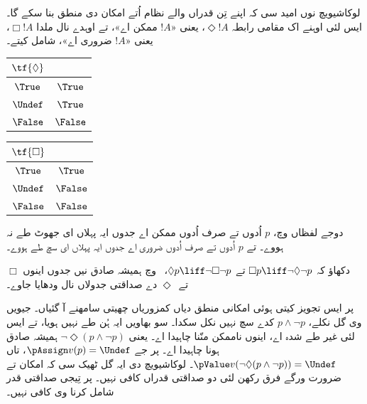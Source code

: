 \documentclass[../../../include/open-logic-section]{subfiles}
\begin{document}
لوکاشیویچ نوں امید سی کہ اپنے تِن قدراں والے نظام اُتے امکان
دی منطق بنا سکے گا۔ ایس لئی اوہنے اک مقامی رابطہ $\Diamond
!A$، یعنی «$!A$ ممکن اے»، تے اوہدے نال ملدا $\Box !A$،
یعنی «$!A$ ضروری اے»، شامل کیتے۔
\begin{center}
  \begin{tabular}{c|c} 
    $\tf{\Diamond}$ & \\ 
    \hline  
    $\True$ & $\True$ \\ 
    $\Undef$ & $\True$ \\
    $\False$ & $\False$ 
  \end{tabular}
  \quad
  \begin{tabular}{c|c} 
    $\tf{\Box}$ & \\ 
    \hline  
    $\True$ & $\True$ \\ 
    $\Undef$ & $\False$ \\
    $\False$ & $\False$ 
  \end{tabular}
\end{center}
دوجے لفظاں وچ، $p$ اُدوں تے صرف اُدوں ممکن اے جدوں ایہ
پہلاں ای جھوٹ طے نہ ہووے۔ تے $p$ اُدوں تے صرف اُدوں ضروری
اے جدوں ایہ پہلاں ای سچ طے ہووے۔

\begin{prob}
  دکھاؤ کہ $\Box p \liff \lnot\Diamond \lnot p$ تے $\Diamond p \liff
  \lnot \Box \lnot p$، ~\LogLuk[3] وچ ہمیشہ صادق نیں جدوں
  اینوں $\Box$ تے~$\Diamond$ دے صداقتی جدولاں نال ودھایا جاوے۔
\end{prob}

پر ایس تجویز کیتی ہوئی امکانی منطق دیاں کمزوریاں چھیتی
سامھنے آ گئیاں۔ جیویں وی گل نکلے، $p \land \lnot p$ کدے سچ
نہیں نکل سکدا۔ سو بھاویں ایہ ہُن طے نہیں ہویا، تے ایس لئی
غیر طے شدہ اے، اینوں ناممکن منّنا چاہیدا اے۔ یعنی
$\lnot \Diamond(p
\land \lnot p)$ ہمیشہ صادق ہونا چاہیدا اے۔ پر جے $\pAssign v(p) =
\Undef$، تاں $\pValue v(\lnot \Diamond(p \land \lnot p)) =
\Undef$۔ لوکاشیویچ دی ایہ گل ٹھیک سی کہ امکان تے ضرورت
ورگے فرق رکھن لئی دو صداقتی قدراں کافی نہیں۔ پر تِیجی
صداقتی قدر شامل کرنا وی کافی نہیں۔
\end{document}
